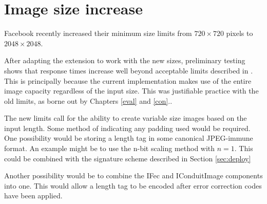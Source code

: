 \chapter{Image size increase}
\label{app:imginc}

Facebook recently increased their minimum size limits from $720 \times 720$ pixels to $2048 \times 2048$. 

After adapting the extension to work with the new sizes, preliminary testing shows that response times increase well beyond acceptable limits described in \cite{response}. This is principally because the current implementation makes use of the entire image capacity regardless of the input size. This was justifiable practice with the old limits, as borne out by Chapters \ref{eval} and \ref{con}..

The new limits call for the ability to create variable size images based on the input length. Some method of indicating any padding used would be required. One possibility would be storing a length tag in some canonical JPEG-immune format. An example might be to use the n-bit scaling method with $n=1$. This could be combined with the signature scheme described in Section \ref{sec:deploy}

Another possibility would be to combine the IFec and IConduitImage components into one. This would allow a length tag to be encoded after error correction codes have been applied.